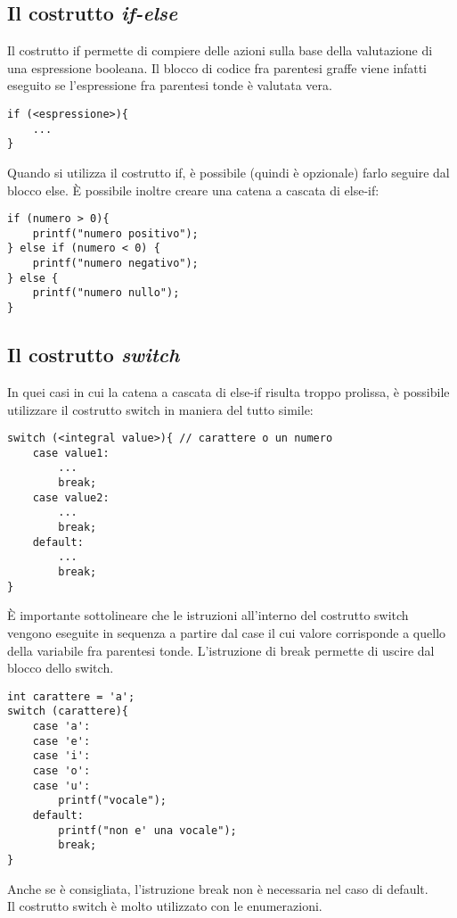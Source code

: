 \subsection{Il costrutto \textit{if-else}}
Il costrutto \colorbox{light-gray}{if} permette di compiere delle azioni sulla base della valutazione di una espressione booleana. Il blocco di codice fra parentesi graffe viene infatti eseguito se l'espressione fra parentesi tonde è valutata vera.
\begin{lstlisting}[title={Struttura del costrutto if}]
if (<espressione>){
    ...
}
\end{lstlisting}
Quando si utilizza il costrutto if, è possibile (quindi è opzionale) farlo seguire dal blocco \colorbox{light-gray}{else}.
\`{E} possibile inoltre creare una catena a cascata di \colorbox{light-gray}{else-if}:
\begin{lstlisting}[title={Utilizzo di if, else-if e ramo else}]
if (numero > 0){
    printf("numero positivo");
} else if (numero < 0) {
    printf("numero negativo");
} else {
    printf("numero nullo");
}
\end{lstlisting}

\subsection{Il costrutto \textit{switch}}
In quei casi in cui la catena a cascata di else-if risulta troppo prolissa, è possibile utilizzare il costrutto \colorbox{light-gray}{switch} in maniera del tutto simile:
\begin{lstlisting}[title={Struttura del costrutto switch}]
switch (<integral value>){ // carattere o un numero
    case value1:
        ...
        break;
    case value2:
        ...
        break;
    default:
        ...
        break;
}
\end{lstlisting}
\`{E} importante sottolineare che le istruzioni all'interno del costrutto switch vengono eseguite in sequenza a partire dal \colorbox{light-gray}{case} il cui valore corrisponde a quello della variabile fra parentesi tonde. L'istruzione di \colorbox{light-gray}{break} permette di uscire dal blocco dello switch.

\begin{lstlisting}[title={Significato dell'istruzione break}]
int carattere = 'a';
switch (carattere){
    case 'a':
    case 'e':
    case 'i':
    case 'o':
    case 'u':
        printf("vocale");
    default:
        printf("non e' una vocale");
        break;
}
\end{lstlisting}
Anche se è consigliata, l'istruzione break non è necessaria nel caso di default.\\
Il costrutto switch è molto utilizzato con le enumerazioni.

